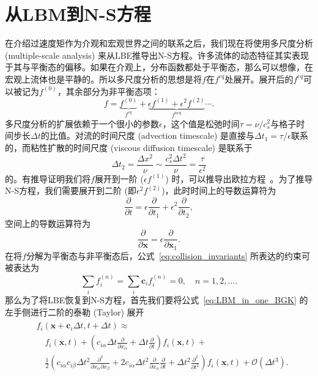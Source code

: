 \section{从LBM到N-S方程}
\label{sec:lbm_to_ns}
在介绍过速度矩作为介观和宏观世界之间的联系之后，我们现在将使用多尺度分析 (multiple-scale analysis) 来从LBE推导出N-S方程。许多流体的动态特征其实表现于其与平衡态的偏移。如果在介观上，分布函数都处于平衡态，那么可以想像，在宏观上流体也是平静的。所以多尺度分析的思想是将$f$在$f^{eq}$处展开。展开后的$f^{eq}$可以被记为$f^{(0)}$，其余部分为非平衡态项：
\begin{equation}
    f=\underbrace{f^{(0)}}_{f^{e q}}+\underbrace{\epsilon f^{(1)}+\epsilon^2 f^{(2)}}_{f^{n e q}} \cdots .
\end{equation}
多尺度分析的扩展依赖于一个很小的参数$\epsilon$，这个值是松弛时间$\tau=\nu/c_s^2$与格子时间步长$\Delta t$的比值。对流的时间尺度 (advection timescale) 是直接与$\Delta t_1=\tau/\epsilon$联系的，而粘性扩散的时间尺度 (viscous diffusion timescale) 是联系于
\begin{equation}
    \Delta t_2=\frac{\Delta x^2}{\nu} \sim \frac{c_s^2 \Delta t^2}{\nu}=\frac{\tau}{\epsilon^2}
    \label{eq:ms_f}
\end{equation}
的。有推导证明我们将$f$展开到一阶 ($\epsilon f^{(1)}$) 时，可以推导出欧拉方程~\citep{huang2008statistical}。为了推导N-S方程，我们需要展开到二阶 (即$\epsilon^2 f^{(2)}$)，此时时间上的导数运算符为
\begin{equation}
    \frac{\partial}{\partial t}=\epsilon \frac{\partial}{\partial t_1}+\epsilon^2 \frac{\partial}{\partial t_2},
    \label{eq:ms_t}
\end{equation}
空间上的导数运算符为
\begin{equation}
    \frac{\partial}{\partial \boldsymbol{x}}=\epsilon \frac{\partial}{\partial \boldsymbol{x}_1}.
    \label{eq:ms_x}
\end{equation}
在将$f$分解为平衡态与非平衡态后，公式~\ref{eq:collision_invariants} 所表达的约束可被表达为
\begin{equation}
    \sum_{i} f_{i}^{(n)}=\sum_{i} \mathbf{c}_{i} f_{i}^{(n)}=0, \quad  n=1,2, \ldots.
\end{equation}
那么为了将LBE恢复到N-S方程，首先我们要将公式~\ref{eq:LBM_in_one_BGK} 的左手侧进行二阶的泰勒 (Taylor) 展开
\begin{align}
    \begin{split}
        & f_{i}\left(\boldsymbol{x}+\mathbf{c}_{i} \Delta t, t+\Delta t\right) \approx \\
        & \quad f_{i}(\boldsymbol{x}, t)+\left({c}_{i \alpha} \Delta t \frac{\partial}{\partial x_{\alpha}}+\Delta t \frac{\partial}{\partial t}\right) f_{i}(\boldsymbol{x}, t)+ \\
        & \quad \frac{1}{2}\left({c}_{i \alpha} {c}_{i \beta} \Delta t^{2} \frac{\partial^{2}}{\partial x_{\alpha} \partial x_{\beta}}+2 {c}_{i \alpha} \Delta t^{2} \frac{\partial}{\partial x_{\alpha}} \frac{\partial}{\partial t}+\Delta t^{2} \frac{\partial^{2}}{\partial t^{2}}\right) f_{i}(\boldsymbol{x}, t)+\mathcal{O}\left(\Delta t^{3}\right) .
    \end{split}
    \label{eq:ms_taylor}
\end{align}

